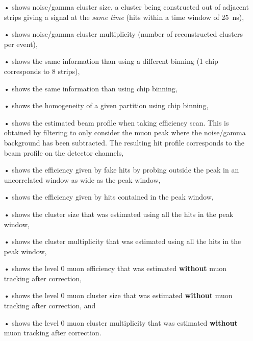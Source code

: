 \begin{itemize}
		\item[•]  shows noise/gamma cluster size, a cluster being constructed out of adjacent strips giving a signal at the \textit{same time} (hits within a time window of \SI{25}{ns}),
		\item[•]  shows noise/gamma cluster multiplicity (number of reconstructed clusters per event),
		\item[•]  shows the same information than  using a different binning (1 chip corresponds to 8 strips),
		\item[•]  shows the same information than  using chip binning,
		\item[•]  shows the homogeneity of a given partition using chip binning,
		\item[•]  shows the estimated beam profile when taking efficiency scan. This is obtained by filtering  to only consider the muon peak where the noise/gamma background has been subtracted. The resulting hit profile corresponds to the beam profile on the detector channels,
		\item[•]  shows the efficiency given by fake hits by probing outside the peak in an uncorrelated window as wide as the peak window,
		\item[•]  shows the efficiency given by hits contained in the peak window,
		\item[•]  shows the cluster size that was estimated using all the hits in the peak window,
		\item[•]  shows the cluster multiplicity that was estimated using all the hits in the peak window,
		\item[•]  shows the level 0 muon efficiency that was estimated \textbf{without} muon tracking after correction,
		\item[•]  shows the level 0 muon cluster size that was estimated \textbf{without} muon tracking after correction, and
		\item[•]  shows the level 0 muon cluster multiplicity that was estimated \textbf{without} muon tracking after correction.
	\end{itemize}

